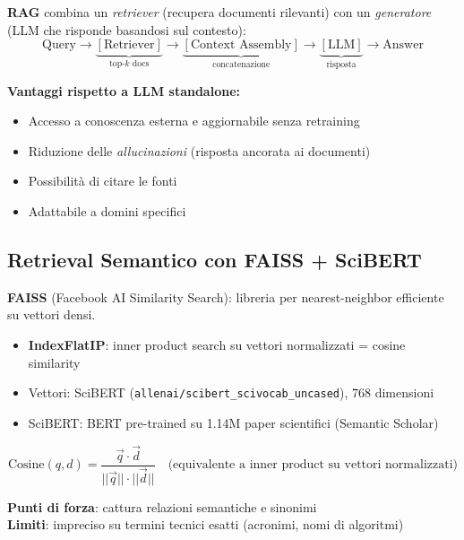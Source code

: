 \documentclass[12pt,a4paper]{article}
\begin{document}
\begin{defbox}
\textbf{RAG} combina un \emph{retriever} (recupera documenti rilevanti) con un \emph{generatore} (LLM che risponde basandosi sul contesto):
\[
\text{Query} \to \underbrace{[\text{Retriever}]}_{\text{top-}k\text{ docs}} \to \underbrace{[\text{Context Assembly}]}_{\text{concatenazione}} \to \underbrace{[\text{LLM}]}_{\text{risposta}} \to \text{Answer}
\]

\textbf{Vantaggi rispetto a LLM standalone:}
\begin{itemize}
  \item Accesso a conoscenza esterna e aggiornabile senza retraining
  \item Riduzione delle \emph{allucinazioni} (risposta ancorata ai documenti)
  \item Possibilit\`a di citare le fonti
  \item Adattabile a domini specifici
\end{itemize}
\end{defbox}

\subsection{Retrieval Semantico con FAISS + SciBERT}

\begin{defbox}
\textbf{FAISS} (Facebook AI Similarity Search): libreria per nearest-neighbor efficiente su vettori densi.
\begin{itemize}
  \item \textbf{IndexFlatIP}: inner product search su vettori normalizzati = cosine similarity
  \item Vettori: SciBERT (\texttt{allenai/scibert\_scivocab\_uncased}), 768 dimensioni
  \item SciBERT: BERT pre-trained su 1.14M paper scientifici (Semantic Scholar)
\end{itemize}
\end{defbox}

\begin{formulabox}
\[
\text{Cosine}(q, d) = \frac{\vec{q} \cdot \vec{d}}{||\vec{q}|| \cdot ||\vec{d}||} \quad \text{(equivalente a inner product su vettori normalizzati)}
\]
\end{formulabox}

\textbf{Punti di forza}: cattura relazioni semantiche e sinonimi\\
\textbf{Limiti}: impreciso su termini tecnici esatti (acronimi, nomi di algoritmi)
\end{document}
